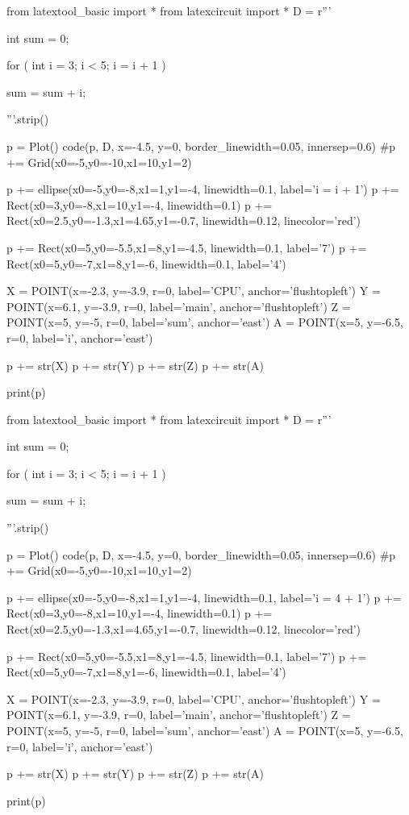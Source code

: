 \begin{python}
from latextool_basic import *
from latexcircuit import *
D = r'''



int sum = 0;

    for ( int i = 3;     i < 5;     i = i + 1 )


        sum = sum + i;



'''.strip()

p = Plot()
code(p, D, x=-4.5, y=0, border_linewidth=0.05, innersep=0.6)
#p += Grid(x0=-5,y0=-10,x1=10,y1=2)

p += ellipse(x0=-5,y0=-8,x1=1,y1=-4, linewidth=0.1, label='i = i + 1')
p += Rect(x0=3,y0=-8,x1=10,y1=-4, linewidth=0.1)
p += Rect(x0=2.5,y0=-1.3,x1=4.65,y1=-0.7, linewidth=0.12, linecolor='red')

p += Rect(x0=5,y0=-5.5,x1=8,y1=-4.5, linewidth=0.1, label='7')
p += Rect(x0=5,y0=-7,x1=8,y1=-6, linewidth=0.1, label='4')

X = POINT(x=-2.3, y=-3.9, r=0, label='CPU', anchor='flushtopleft')
Y = POINT(x=6.1, y=-3.9, r=0, label='main', anchor='flushtopleft')
Z = POINT(x=5, y=-5, r=0, label='sum', anchor='east')
A = POINT(x=5, y=-6.5, r=0, label='i', anchor='east')

p += str(X)
p += str(Y)
p += str(Z)
p += str(A)

print(p)
\end{python}

\begin{python}
from latextool_basic import *
from latexcircuit import *
D = r'''



int sum = 0;

    for ( int i = 3;     i < 5;     i = i + 1 )


        sum = sum + i;



'''.strip()

p = Plot()
code(p, D, x=-4.5, y=0, border_linewidth=0.05, innersep=0.6)
#p += Grid(x0=-5,y0=-10,x1=10,y1=2)

p += ellipse(x0=-5,y0=-8,x1=1,y1=-4, linewidth=0.1, label='i = 4 + 1')
p += Rect(x0=3,y0=-8,x1=10,y1=-4, linewidth=0.1)
p += Rect(x0=2.5,y0=-1.3,x1=4.65,y1=-0.7, linewidth=0.12, linecolor='red')

p += Rect(x0=5,y0=-5.5,x1=8,y1=-4.5, linewidth=0.1, label='7')
p += Rect(x0=5,y0=-7,x1=8,y1=-6, linewidth=0.1, label='4')

X = POINT(x=-2.3, y=-3.9, r=0, label='CPU', anchor='flushtopleft')
Y = POINT(x=6.1, y=-3.9, r=0, label='main', anchor='flushtopleft')
Z = POINT(x=5, y=-5, r=0, label='sum', anchor='east')
A = POINT(x=5, y=-6.5, r=0, label='i', anchor='east')

p += str(X)
p += str(Y)
p += str(Z)
p += str(A)

print(p)
\end{python}

